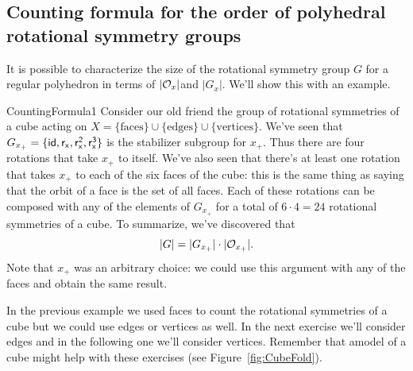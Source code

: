 
\subsection{Counting formula for the order of  polyhedral rotational symmetry groups}

It is possible to characterize the size of the rotational symmetry group $G$ for a regular polyhedron in terms of $|{\cal O}_x|$and $|G_x|$. We'll show this with an example.

\begin{example}{CountingFormula1} 
Consider our old friend the group of rotational symmetries of a cube acting on $X=\{\text{faces}\}\cup\{\text{edges}\}\cup\{\text{vertices}\}$. We've seen that $G_{x_+}=\{\sf{id},r_x,r_x^2,r_x^3\}$ is the stabilizer subgroup for $x_+$.  Thus there are four rotations that take $x_+$ to itself.  We've also seen that there's at least one rotation that takes $x_+$ to each of the six faces of the cube:  this is the same thing as saying that the orbit of a face is the set of all faces.  Each of these rotations can be composed with any of the elements of $G_{x_+}$ for a total of $6\cdot 4=24$ rotational symmetries of a cube.  To summarize, we've discovered that 
$$|G|=|G_{x_+}|\cdot |{\cal O}_{x_+}|.$$
Note that $x_+$ was an arbitrary choice: we could use this argument with any of the faces and obtain the same result.
\end{example}

In the previous example we used faces to count the rotational symmetries of a cube but we could use edges or vertices as well.  In the next exercise we'll consider edges and in the following one we'll consider vertices.   Remember that amodel of a cube might help with these exercises (see Figure~\ref{fig:CubeFold}).

